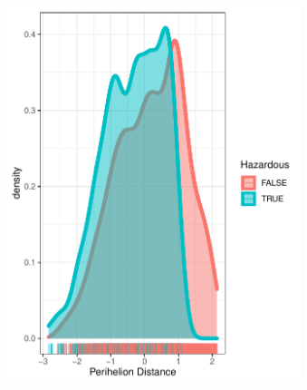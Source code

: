 \documentclass{beamer}
\begin{document}
\begin{frame}
\begin{columns}
  \begin{figure}[b]{\textwidth}
    \centering
    \includegraphics[width=\textwidth]{Pic/DENSITY_Perihelion_Distance.pdf}
    \vspace{4ex}
  \end{figure} 
  \begin{figure}[b]{\textwidth}
    \centering

\end{figure}
\end{columns}
\end{frame}
\end{document}
